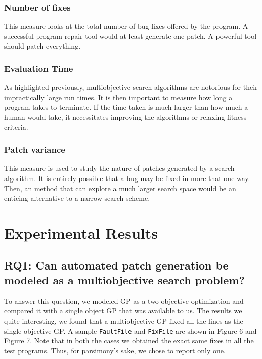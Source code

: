 \documentclass{sig-alternate}
\theoremstyle{break}
\begin{document}
\subsubsection{Number of fixes}

This measure looks at the total number of bug fixes offered by the program. A successful program repair tool would at least generate one patch. A powerful tool should patch everything.  

\subsubsection{Evaluation Time}

As highlighted previously, multiobjective search algorithms are notorious for their impractically large run times. It is then important to measure how long a program takes to terminate. If the time taken is much larger than how much a human would take, it necessitates improving the algorithms or relaxing fitness criteria.

\subsubsection{Patch variance}

This measure is used to study the nature of patches generated by a search algorithm. It is entirely possible that a bug may be fixed in more that one way. Then, an method that can explore a much larger search space would be an enticing alternative to a narrow search scheme.  

\pagebreak
\section{Experimental Results}
\label{results}

\subsection*{RQ1: Can automated patch generation be modeled as a multiobjective search problem?}
To answer this question, we modeled GP as a two objective optimization and compared it with a single object GP that was available to us. The results we quite interesting, we found that a multiobjective GP fixed all the lines as the single objective GP. A sample \texttt{FaultFile} and \texttt{FixFile} are shown in Figure 6 and Figure 7. Note that in both the cases we obtained the exact same fixes in all the test programs. Thus, for parsimony's sake, we chose to report only one.
\end{document}
